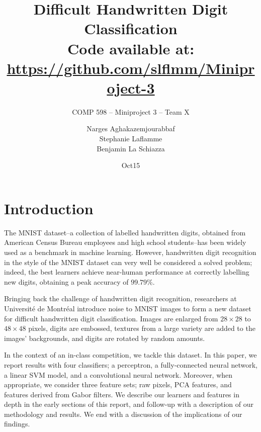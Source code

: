 \documentclass{acm_proc_article-sp}
\begin{document}
\title{Difficult Handwritten Digit Classification \\
{\normalsize Code available at: \url{https://github.com/slflmm/Miniproject-3}}} 
\subtitle{COMP 598 -- Miniproject 3 -- Team X}

\author{
\alignauthor 
Narges Aghakazemjourabbaf\\
\alignauthor
Stephanie Laflamme\\
\alignauthor Benjamin La Schiazza\\
}

\date{Oct15}



\maketitle
\begin{abstract}

\end{abstract}

\section{Introduction}%
The MNIST dataset--a collection of labelled handwritten digits, obtained from American Census Bureau employees and high school students\cite{LeCun2}--has been widely used as a benchmark in machine learning. However, handwritten digit recognition in the style of the MNIST dataset can very well be considered a solved problem; indeed, the best learners achieve near-human performance at correctly labelling new digits\cite{Ciresan}, obtaining a peak accuracy of $99.79\%$\cite{Wan}.

Bringing back the challenge of handwritten digit recognition, researchers at Universit\'{e} de Montr\'{e}al introduce noise to MNIST images to form a new dataset for difficult handwritten digit classification. Images are enlarged from $28\times28$ to $48\times48$ pixels, digits are embossed, textures from a large variety are added to the images' backgrounds, and digits are rotated by random amounts.

In the context of an in-class competition, we tackle this dataset. In this paper, we report results with four classifiers; a perceptron, a fully-connected neural network, a linear SVM model, and a convolutional neural network. Moreover, when appropriate, we consider three feature sets; raw pixels, PCA features, and features derived from Gabor filters. We describe our learners and features in depth in the early sections of this report, and follow-up with a description of our methodology and results. We end with a discussion of the implications of our findings.
\end{document}
